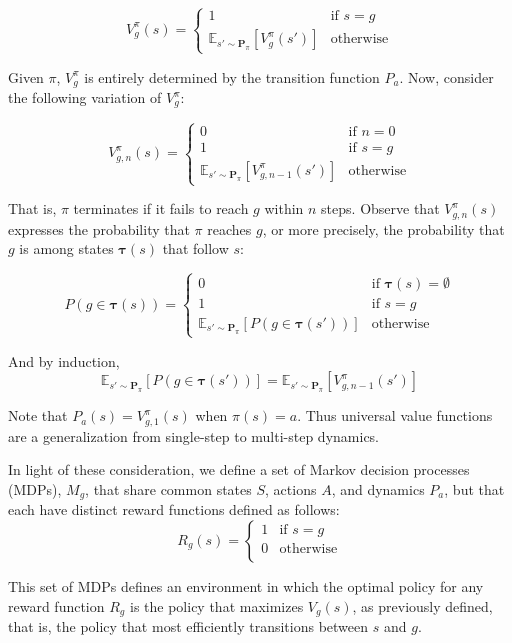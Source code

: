 \documentclass{article}
\begin{document}
\[ 
V_{g}^\pi(s) = 
  \begin{cases}
    1 & \text{if } s = g \\ 
    \mathbb{E}_{s' \sim \bm{P}_{\pi}}\left [ V_{g}^\pi(s') \right ] & \text{otherwise}
  \end{cases}
\]

Given $\pi$, $V_{g}^\pi$ is entirely determined by the transition function $P_a$. Now, consider the following variation of $V_g^\pi$:

\[
V_{g, n}^\pi(s) = 
	\begin{cases}
		0 & \text{if } n = 0 \\ 
		1 & \text{if } s = g \\ 
		\mathbb{E}_{s' \sim \bm{P}_{\pi}}\left [ V_{g, n-1}^\pi(s') \right ] & \text{otherwise}
	\end{cases}
\]

That is, $\pi$ terminates if it fails to reach $g$ within $n$ steps. Observe that $V_{g, n}^\pi(s)$ expresses the probability that $\pi$ reaches $g$, or more precisely, the probability that $g$ is among states $\bm{\tau}(s)$ that follow $s$:

\[ 
P\left(g \in \bm{\tau}(s)\right) =
\begin{cases}
    0 & \text{if } \bm{\tau}(s) = \emptyset \\ 
    1 & \text{if } s = g \\ 
    \mathbb{E}_{s' \sim \bm{P}_{\pi}}\left[ P \left( g \in \bm{\tau}(s') \right) \right] & \text{otherwise}
\end{cases}
\]

And by induction, 
\[
\mathbb{E}_{s' \sim \bm{P}_{\pi}}\left[ P \left( g \in \bm{\tau}(s') \right) \right] = \mathbb{E}_{s' \sim \bm{P}_{\pi}}\left[ V_{g, n-1}^\pi(s') \right]
\]

Note that $P_a(s) = V_{g, 1}^\pi(s)$ when $\pi(s) = a$. Thus universal value functions are a generalization from single-step to multi-step dynamics.

In light of these consideration, we define a set of Markov decision processes (MDPs), $M_{g}$, that share common states $S$, actions $A$, and dynamics $P_a$, but that each have distinct reward functions defined as follows:
\[
  R_{g}(s) = 
  \begin{cases}
    1 & \text{if } s = g \\ 
    0 & \text{otherwise} \\ 
  \end{cases}
\]

This set of MDPs defines an environment in which the optimal policy for any reward function $R_{g}$ is the policy that maximizes $V_g(s)$, as previously defined, that is, the policy that most efficiently transitions between $s$ and $g$.
\end{document}
